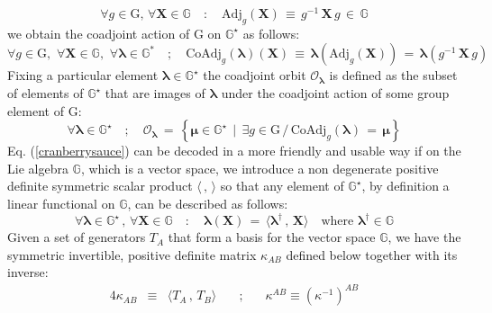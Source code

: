 \documentclass[10pt,a4paper]{article}
\begin{document}
 \begin{equation}\label{aggiunta}
   \forall g\in \mathrm{G}, \, \forall \mathbf{X} \in \mathbb{G} \quad : \quad \text{Adj}_g (\mathbf{X}) \, \equiv \, g^{-1} \, \mathbf{X} \, g \, \in \, \mathbb{G}
 \end{equation}
 we obtain the coadjoint action of $\mathrm{G}$ on $\mathbb{G}^\star$ as follows:
 \begin{equation}\label{crapitto}
   \forall g\in \mathrm{G}, \,\, \forall \mathbf{X} \in \mathbb{G}, \,\, \forall \boldsymbol{\lambda} \in \mathbb{G}^* \quad ; \quad
   \text{CoAdj}_g (\boldsymbol{\lambda})\left( \mathbf{X}\right) \, \equiv \, \boldsymbol{\lambda}\left(\text{Adj}_g \left(\mathbf{X}\right) \right)\, = \,
   \boldsymbol{\lambda}\left( g^{-1} \, \mathbf{X} \, g \right)
 \end{equation}
 Fixing a particular element $\boldsymbol{\lambda} \in \mathbb{G}^\star$ the coadjoint orbit $\mathcal{O}_{\boldsymbol{\lambda}}$
 is defined as the subset of elements of $\mathbb{G}^\star$ that are images of $\boldsymbol{\lambda} $ under the coadjoint action of some group element of $\mathrm{G}$:
 \begin{equation}\label{cranberrysauce}
  \forall \boldsymbol{\lambda}\in \mathbb{G}^\star \quad ; \quad  \mathcal{O}_{\boldsymbol{\lambda}} \, = \, \left\{
  \boldsymbol{\mu} \in \mathbb{G}^\star \, \mid \, \exists g \in \mathrm{G} \, / \, \text{CoAdj}_g (\boldsymbol{\lambda}) \, = \, \boldsymbol{\mu} \right\}
 \end{equation}
 Eq. (\ref{cranberrysauce}) can be decoded in a more friendly and usable way if on the Lie algebra $\mathbb{G}$, which is a vector space, we introduce a non degenerate positive definite symmetric scalar product $\langle\, ,\, \rangle$ so that any element of $\mathbb{G}^\star$, by definition  a linear functional on $\mathbb{G}$, can be described as follows:
 \begin{equation}\label{frido}
   \forall \boldsymbol{\lambda} \in \mathbb{G}^\star\, , \, \forall \mathbf{X} \in \mathbb{G} \quad : \quad \boldsymbol{\lambda}(\mathbf{X} ) \, = \, \langle \boldsymbol{\lambda}^\dagger\, ,\, \mathbf{X} \rangle \quad \text{where $\boldsymbol{\lambda}^\dagger
   \in \mathbb{G}$}
 \end{equation}
 Given a set of generators $T_A$ that form a basis for the vector space $\mathbb{G}$, we have the symmetric invertible, positive definite matrix $\kappa_{AB}$ defined below together with its inverse:
 \begin{alignat}{4}\label{carnevaledioslo}
   \kappa_{AB} & \equiv & \langle T_A\, ,\, T_B \rangle &\quad ; \quad &\kappa^{AB} \equiv \left (\kappa^{-1}\right)^{AB}
 \end{alignat}
\end{document}
